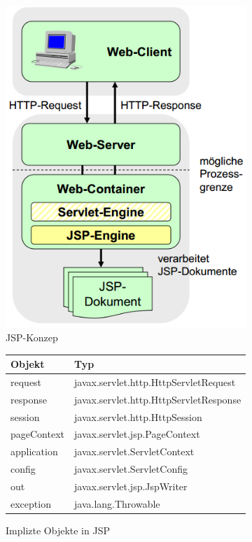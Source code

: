 \begin{figure}[h]
\begin{subfigure}[b]{.4\textwidth}
 \includegraphics[scale=0.3]{Bilder/jsp.png}
 \caption{JSP-Konzep}
 \label{fig:jsp}
\end{subfigure}
\begin{subfigure}[b]{.5\textwidth}
\begin{tabular}{|l|l|}
\hline
\textbf{Objekt} & \textbf{Typ} \\\hline
request	& javax.servlet.http.HttpServletRequest \\\hline
response & javax.servlet.http.HttpServletResponse \\\hline
session & javax.servlet.http.HttpSession \\\hline
pageContext	& javax.servlet.jsp.PageContext \\\hline
application	& javax.servlet.ServletContext \\\hline
config& javax.servlet.ServletConfig \\ \hline
out	& javax.servlet.jsp.JspWriter \\\hline
exception & java.lang.Throwable \\\hline
\end{tabular}
\caption{Implizte Objekte in JSP}
\label{fig:implicitObj}
\end{subfigure}
\caption{}
\end{figure}


